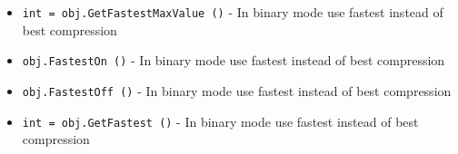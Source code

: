 \begin{itemize}
\item  \verb|int = obj.GetFastestMaxValue ()| -  In binary mode use fastest instead of best compression

\item  \verb|obj.FastestOn ()| -  In binary mode use fastest instead of best compression

\item  \verb|obj.FastestOff ()| -  In binary mode use fastest instead of best compression

\item  \verb|int = obj.GetFastest ()| -  In binary mode use fastest instead of best compression

\end{itemize}
